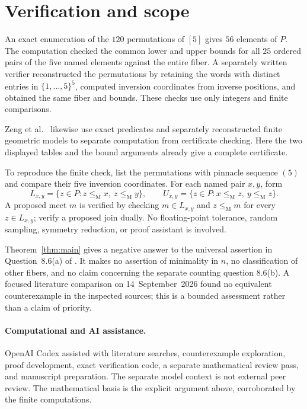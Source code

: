 \documentclass[11pt]{article}
\newcommand{\leM}{\leq_{\mathrm M}}
\begin{document}
\section{Verification and scope}

An exact enumeration of the $120$ permutations of $[5]$ gives $56$
elements of $P$. The computation checked the common lower and upper
bounds for all $25$ ordered pairs of the five named elements against
the entire fiber. A separately written verifier reconstructed the
permutations by retaining the words with distinct entries in
$\{1,\ldots,5\}^5$, computed inversion coordinates from inverse
positions, and obtained the same fiber and bounds. These checks use
only integers and finite comparisons.

Zeng et al.\ \cite[Proposition~1 and Section~6]{ZLRO} likewise use exact
predicates and separately reconstructed finite geometric models to
separate computation from certificate checking. Here the two displayed
tables and the bound arguments already give a complete certificate.

To reproduce the finite check, list the permutations with pinnacle
sequence $(5)$ and compare their five inversion coordinates. For each
named pair $x,y$, form
\[
 L_{x,y}=\{z\in P:z\leM x,\ z\leM y\},\qquad
 U_{x,y}=\{z\in P:x\leM z,\ y\leM z\}.
\]
A proposed meet $m$ is verified by checking $m\in L_{x,y}$ and
$z\leM m$ for every $z\in L_{x,y}$; verify a proposed join dually.
No floating-point tolerance, random sampling, symmetry reduction, or
proof assistant is involved.

Theorem~\ref{thm:main} gives a negative answer to the universal assertion
in Question~8.6(a) of \cite{LS}. It makes no assertion of minimality in
$n$, no classification of other fibers, and no claim concerning the
separate counting question 8.6(b). A focused literature comparison on
14~September~2026 found no equivalent counterexample in the inspected
sources; this is a bounded assessment rather than a claim of priority.

\paragraph{Computational and AI assistance.}
OpenAI Codex assisted with literature searches, counterexample
exploration, proof development, exact verification code, a separate
mathematical review pass, and manuscript preparation. The separate
model context is not external peer review. The mathematical basis is
the explicit argument above, corroborated by the finite computations.



\end{document}

